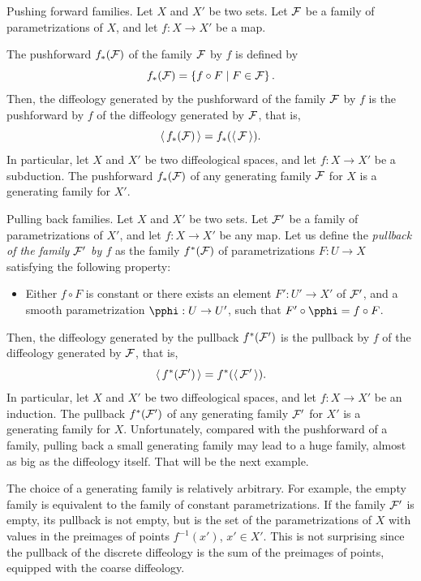 \begin{Article}{Pushing forward families.}{}
  Let $X$ and $X'$ be two sets.
  Let $\mathcal{F}$ be a family of parametrizations of $X$,
  and let $f : X \to X'$ be a map.
  
  The pushforward $f_*(\mathcal{F})$ of the family $\mathcal{F}$ by $f$ is defined by
  $$%
    f_*(\cF) = \left\{ f \circ F \mid F \in \cF \right\}.
    $$%
  Then,
  the diffeology generated by the pushforward of the family $\mathcal{F}$ by $f$ is the pushforward by $f$ of the diffeology generated by $\mathcal{F}$,
  that is,
  $$%
    \gen{f_*(\cF)} = f_*(\gen{\cF}).
    $$%
  In particular,
  let $X$ and $X'$ be two diffeological spaces,
  and
  let $f : X \to X'$ be a subduction.
  The pushforward $f_*(\mathcal{F})$ of any generating family $\mathcal{F}$ for $X$ is a generating family for $X'$.
\end{Article}

\begin{Article}{Pulling back families.}{}
  Let $X$ and $X'$ be two sets.
  Let $\mathcal{F}'$ be a family of parametrizations of $X'$,
  and let $f : X \to X'$ be any map.
  Let us define the \emph{pullback of the family $\mathcal{F}'$ by $f$} as the family $f^*(\mathcal{F})$ of parametrizations $F : U \to X$ satisfying the following property:
  \begin{itemize}
    \item[($\diamondsuit$)] Either $f\circ F$ is constant or there exists an element $F' : U' \to X'$ of $\mathcal{F}'$,
    and a smooth parametrization $\pphi : U \to U'$,
    such that $F' \circ \pphi = f \circ F$.
  \end{itemize}
  Then,
  the diffeology generated by the pullback $f^*(\mathcal{F}')$ is the pullback by $f$ of the diffeology generated by $\mathcal{F}$,
  that is,
  $$%
    \gen{f^*(\cF')} = f^*(\gen{\cF'}).
    $$%
  In particular,
  let $X$ and $X'$ be two diffeological spaces,
  and let $f : X \to X'$ be an induction.
  The pullback $f^*(\mathcal{F}')$ of any generating family $\mathcal{F}'$ for $X'$ is a generating family for $X$.
  Unfortunately,
  compared with the pushforward of a family,
  pulling back a small generating family may lead to a huge family,
  almost as big as the diffeology itself.
  That will be the next example.
  
  \Note The choice of a generating family is relatively arbitrary.
  For example,
  the empty family is equivalent to the
  family of constant parametrizations.
  If the family $\mathcal{F}'$ is empty,
  its pullback is not empty,
  but is the set of the parametrizations of $X$ with values in the preimages of points $f^{-1}(x')$,
  $x' \in X'$.
  This is not surprising since the pullback of the discrete diffeology is the sum of the preimages of points,
  equipped with the coarse diffeology.
\end{Article}

